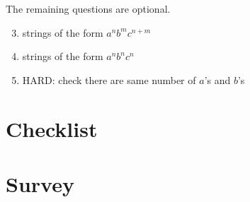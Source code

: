 \begin{appendices}
The remaining questions are optional. 
\begin{enumerate}
    \setcounter{enumi}{2}
    \item strings of the form $a^n b^m c^{n+m}$
    \item strings of the form $a^n b^n c^n$
    \item HARD: check there are same number of $a$'s and $b$'s
\end{enumerate}

\section{Checklist}
\section{Survey}



\end{appendices}